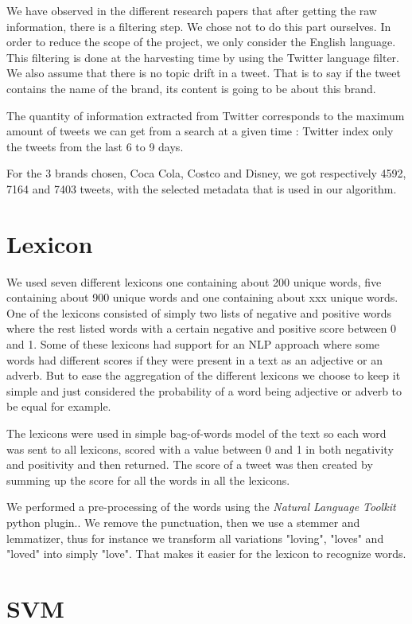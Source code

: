 \documentclass[a4paper,12pt]{report}
\begin{document}
We have observed in the different research papers that after getting the raw information, there is a filtering step. We chose not to do this part ourselves. In order to reduce the scope of the project, we only consider the English language. This filtering is done at the harvesting time by using the Twitter language filter.
We also assume that there is no topic drift in a tweet. That is to say if the tweet contains the name of the brand, its content is going to be about this brand.

The quantity of information extracted from Twitter corresponds to the maximum amount of tweets we can get from a search at a given time : Twitter index only the tweets from the last 6 to 9 days.

For the 3 brands chosen, Coca Cola, Costco and Disney, we got respectively 4592, 7164 and 7403 tweets, with the selected metadata that is used in our algorithm.

\section{Lexicon}

We used seven different lexicons one containing about 200 unique words, five containing about 900 unique words and one containing about xxx unique words.
One of the lexicons consisted of simply two lists of negative and positive words where the rest listed words with a certain negative and positive score between 0 and 1. 
Some of these lexicons had support for an NLP approach where some words had different scores if they were present in a text as an adjective or an adverb.  
But to ease the aggregation of the different lexicons we choose to keep it simple and just considered the probability of a word being adjective or adverb to be equal for example.

The lexicons were used in simple bag-of-words model of the text so each word was sent to all lexicons, scored with a value between 0 and 1 in both negativity and positivity and then returned. 
The score of a tweet was then created by summing up the score for all the words in all the lexicons.

We performed a pre-processing of the words using the \textit{Natural Language Toolkit} python plugin.\cite{NLTK}.
We remove the punctuation, then we use a stemmer and lemmatizer, thus for instance we transform all variations "loving", "loves" and "loved" into simply "love".
That makes it easier for the lexicon to recognize words.

\section{SVM}
\end{document}
